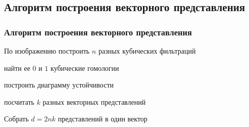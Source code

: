 \documentclass{beamer}
\begin{document}
		\subsection{Алгоритм построения векторного представления}
		\begin{frame}
			\frametitle{Алгоритм построения векторного представления}
			\begin{algorithm}[H]
				\normalsize
				\SetAlgoLined
				По изображению построить $n$ разных кубических фильтраций
				
				{найти ее $0$ и $1$ кубические гомологии
					
				 построить диаграмму устойчивости
			 		
			 	 посчитать $k$ разных векторных представлений
		 		
	 			} 
 				
 				Собрать $d = 2nk$ представлений в один вектор
			\end{algorithm}
		\end{frame}

		
\end{document}

